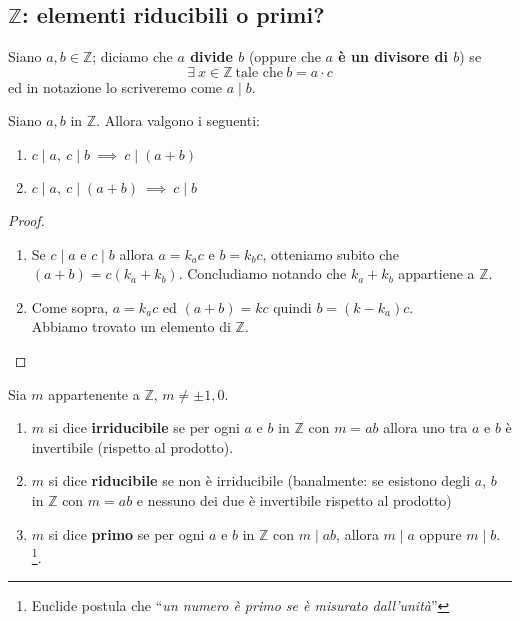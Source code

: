 \subsection{$\mathbb{Z}$: elementi riducibili o primi?}
\begin{definizione}[Divisore] Siano $a,b \in \mathbb{Z}$; diciamo che \textbf{$a$ divide $b$} (oppure che \textbf{$a$ è un divisore di $b$}) se 
	\begin{equation*}
	\exists \ x \in \mathbb{Z} \ \text{tale che} \ b = a \cdot c
	\end{equation*}
	ed in notazione lo scriveremo come $a \mid  b$.
\end{definizione}
\begin{proposizione}
	Siano $a,b$ in $\mathbb{Z}$. Allora valgono i seguenti:
	\begin{enumerate}
		\item $c\mid a, \ c\mid b \ \implies \ c\mid (a+b)$
		\item $c\mid a, \ c\mid (a+b) \ \implies \ c\mid b$
	\end{enumerate}
\end{proposizione}
\begin{proof}\ 
\begin{enumerate}
	\item Se $c\mid a$ e $c\mid b$ allora $a=k_a c$ e $b = k_b c$, otteniamo subito che $(a+b)=c(k_a+k_b)$. Concludiamo notando che $k_a+k_b$ appartiene a $\mathbb{Z}$.
	\item Come sopra, $a=k_ac$ ed $(a+b)=kc$ quindi $b=(k-k_a)c$. \\ Abbiamo trovato un elemento di $\mathbb{Z}$.
\end{enumerate}
\end{proof}
\begin{definizione}
	Sia $m$ appartenente a $\mathbb{Z}$, $m \neq \pm 1, 0$.
	\begin{enumerate}
		\item $m$ si dice \textbf{irriducibile} se per ogni $a$ e $b$ in $\mathbb{Z}$ con $m=ab$ allora uno tra $a$ e $b$ è invertibile (rispetto al prodotto).
		\item $m$ si dice \textbf{riducibile} se non è irriducibile (banalmente: se esistono degli $a$, $b$ in $\mathbb{Z}$ con $m=ab$ e nessuno dei due è invertibile rispetto al prodotto)
		\item $m$ si dice \textbf{primo} se per ogni $a$ e $b$ in $\mathbb{Z}$ con $m\mid ab$, allora $m\mid a$ oppure $m\mid b$. \footnote{Euclide postula che \enquote{\textit{un numero è primo se è misurato dall'unità}}}.
	\end{enumerate}
\end{definizione}
